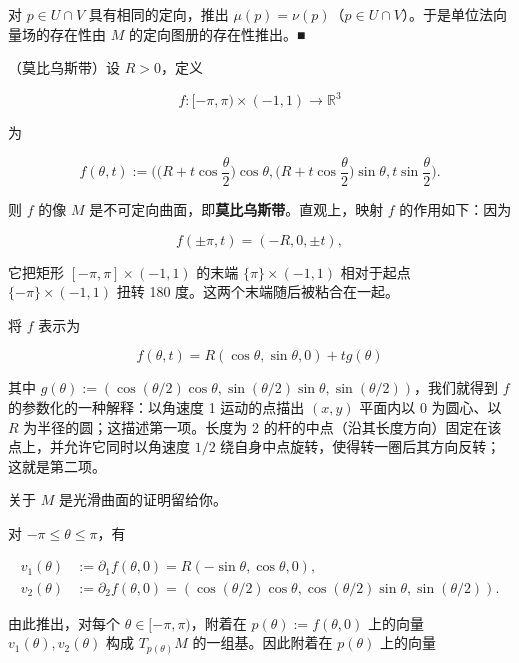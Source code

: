 \begin{example}
\begin{items}
对 $ p \in U \cap V $ 具有相同的定向，推出 $ \mu(p) = \nu(p) $（$ p \in U \cap V $）。于是单位法向量场的存在性由 $ M $ 的定向图册的存在性推出。\nobreak\hspace{0.35em}■

\item

（莫比乌斯带）设 $ R > 0 $，定义

\[
f: [-\pi, \pi) \times (-1,1) \to \mathbb{R}^{3}
\]

为

\[
f(\theta,t) := \Big( \big( R + t\cos\frac{\theta}{2} \big)\cos\theta, \big( R + t\cos\frac{\theta}{2} \big)\sin\theta, t\sin\frac{\theta}{2} \Big) .
\]

则 $ f $ 的像 $ M $ 是不可定向曲面，即\textbf{莫比乌斯带}。直观上，映射 $ f $ 的作用如下：因为

\[
f(\pm\pi, t) = (-R, 0, \pm t) ,
\]

它把矩形 $ [-\pi, \pi] \times (-1,1) $ 的末端 $ \{ \pi \} \times (-1,1) $ 相对于起点 $ \{ -\pi \} \times (-1,1) $ 扭转 180 度。这两个末端随后被粘合在一起。

\end{items}


将 $ f $ 表示为

\[
f(\theta,t) = R(\cos\theta, \sin\theta, 0) + tg(\theta)
\]

其中 $ g(\theta) := (\cos(\theta/2)\cos\theta, \sin(\theta/2)\sin\theta, \sin(\theta/2)) $，我们就得到 $ f $ 的参数化的一种解释：以角速度 1 运动的点描出 $ (x,y) $ 平面内以 0 为圆心、以 $ R $ 为半径的圆；这描述第一项。长度为 2 的杆的中点（沿其长度方向）固定在该点上，并允许它同时以角速度 $ 1/2 $ 绕自身中点旋转，使得转一圈后其方向反转；这就是第二项。

\proofhead
关于 $ M $ 是光滑曲面的证明留给你。

对 $ -\pi \le \theta \le \pi $，有

\begin{equation*}
\begin{aligned}
v_1(\theta) &:= \partial_1 f(\theta,0) = R(-\sin\theta, \cos\theta, 0) , \\ v_2(\theta) &:= \partial_2 f(\theta,0) = (\cos(\theta/2)\cos\theta, \cos(\theta/2)\sin\theta, \sin(\theta/2)) .
\end{aligned}
\end{equation*}

由此推出，对每个 $ \theta \in [-\pi,\pi) $，附着在 $ p(\theta) := f(\theta,0) $ 上的向量 $ v_1(\theta), v_2(\theta) $ 构成 $ T_{p(\theta)}M $ 的一组基。因此附着在 $ p(\theta) $ 上的向量


\end{example}
